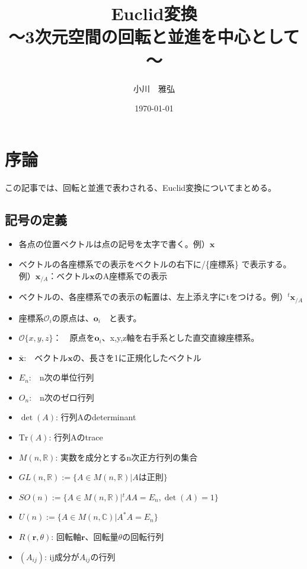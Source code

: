 \documentclass[10pt]{jarticle}
\begin{document}
\title{Euclid変換\\～3次元空間の回転と並進を中心として～}
\author{小川　雅弘}
\date{\today}
\maketitle

\tableofcontents

\section{序論}
この記事では、回転と並進で表わされる、Euclid変換についてまとめる。

\subsection{記号の定義}
\begin{itemize}
\item 各点の位置ベクトルは点の記号を太字で書く。例）$\boldsymbol{x}$ 
\item ベクトルの各座標系での表示をベクトルの右下に/\{座標系\} で表示する。
例）$\boldsymbol{x}_{/A}$：ベクトル$\boldsymbol{x}$のA座標系での表示 
\item ベクトルの、各座標系での表示の転置は、左上添え字にtをつける。例）$^t\boldsymbol{x}_{/A}$
\item 座標系$\mathcal{O}_i$の原点は、$\boldsymbol{o}_i$　と表す。 
\item $\mathcal{O}\{ x,y,z \} $：　原点を$\boldsymbol{o}_i$、x,y,z軸を右手系とした直交直線座標系。
\item $\bar{\boldsymbol{x}}$:　ベクトル$\boldsymbol{x}$の、長さを1に正規化したベクトル
\item $E_n$:　n次の単位行列
\item $O_n$:　n次のゼロ行列
\item $\det(A)$: 行列Aのdeterminant
\item $\mathrm{Tr}(A)$: 行列Aのtrace
\item $M(n,\mathbb{R})$: 実数を成分とするn次正方行列の集合
\item $GL(n,\mathbb{R}):=\{A \in M(n,\mathbb{R}) | Aは正則\}$
\item $SO(n):=\{A \in M(n,\mathbb{R}) | {}^tAA=E_n, \det(A)=1 \}$
\item $U(n):=\{A \in M(n,\mathbb{C}) | A^*A=E_n\}$
\item $R(\boldsymbol{r},\theta)$: 回転軸$\boldsymbol{r}$、回転量$\theta$の回転行列
\item $(A_{ij})$: ij成分が$A_{ij}$の行列
\end{itemize}
\end{document}
